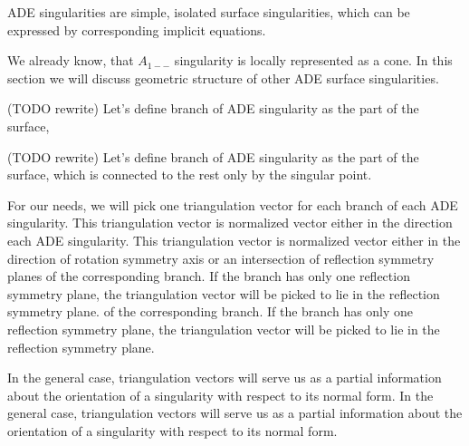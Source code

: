 ADE singularities are simple, isolated surface singularities, which can be
expressed by corresponding implicit equations.

We already know, that $A_{1--}$ singularity is locally represented as a cone.
In this section we will discuss geometric structure of other ADE surface singularities.

\begin{definition} (TODO rewrite)
    Let's define branch of ADE singularity as the part of the surface,
\begin{definition} (TODO rewrite)
    Let's define branch of ADE singularity as the part of the surface,
    which is connected to the rest only by the singular point.
\end{definition}

For our needs, we will pick one triangulation vector for each branch of
each ADE singularity. This triangulation vector is normalized vector
either in the direction
each ADE singularity. This triangulation vector is normalized vector
either in the direction
of rotation symmetry axis or an intersection of reflection symmetry planes
of the corresponding branch. If the branch has only one reflection symmetry
plane, the triangulation vector will be picked to lie in the reflection
symmetry plane.
of the corresponding branch. If the branch has only one reflection symmetry
plane, the triangulation vector will be picked to lie in the reflection
symmetry plane.

In the general case, triangulation vectors will serve us
as a partial information about the orientation of a singularity with 
respect to its normal form.
In the general case, triangulation vectors will serve us
as a partial information about the orientation of a singularity with 
respect to its normal form.


\end{definition}
